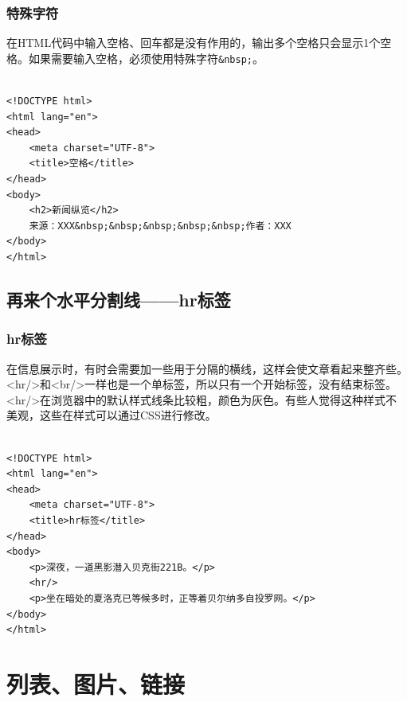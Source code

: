 \subsection{特殊字符}

在HTML代码中输入空格、回车都是没有作用的，输出多个空格只会显示1个空格。如果需要输入空格，必须使用特殊字符\lstinline|&nbsp;|。 \\

 \\
\begin{lstlisting}[style=htmlcssjs]
<!DOCTYPE html>
<html lang="en">
<head>
    <meta charset="UTF-8">
    <title>空格</title>
</head>
<body>
    <h2>新闻纵览</h2>
    来源：XXX&nbsp;&nbsp;&nbsp;&nbsp;&nbsp;作者：XXX
</body>
</html>
\end{lstlisting}

\newpage

\section{再来个水平分割线——hr标签}

\subsection{hr标签}

在信息展示时，有时会需要加一些用于分隔的横线，这样会使文章看起来整齐些。 \\

<hr/>和<br/>一样也是一个单标签，所以只有一个开始标签，没有结束标签。 \\

<hr/>在浏览器中的默认样式线条比较粗，颜色为灰色。有些人觉得这种样式不美观，这些在样式可以通过CSS进行修改。 \\

 \\
\begin{lstlisting}[style=htmlcssjs]
<!DOCTYPE html>
<html lang="en">
<head>
    <meta charset="UTF-8">
    <title>hr标签</title>
</head>
<body>
    <p>深夜，一道黑影潜入贝克街221B。</p>
    <hr/>
    <p>坐在暗处的夏洛克已等候多时，正等着贝尔纳多自投罗网。</p>
</body>
</html>
\end{lstlisting}

\newpage

\chapter{列表、图片、链接}

